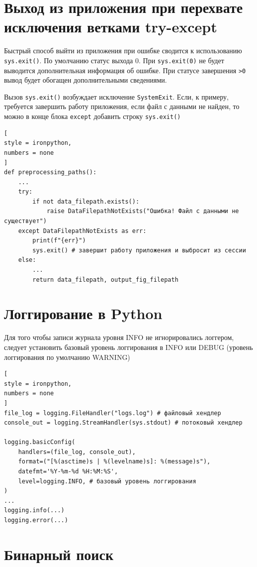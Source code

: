 \documentclass[%
	11pt,
	a4paper,
	utf8,
		]{article}
\begin{document}
\section{Выход из приложения при перехвате исключения ветками try-except}

Быстрый способ выйти из приложения при ошибке сводится к использованию \texttt{sys.exit()}. По умолчанию статус выхода 0. При \texttt{sys.exit(0)} не будет выводится дополнительная информация об ошибке. При статусе завершения \texttt{>0} вывод будет обогащен дополнительными сведениями.

Вызов \texttt{sys.exit()} возбуждает исключение \texttt{SystemExit}. Если, к примеру, требуется завершить работу приложения, если файл с данными не найден, то можно в конце блока \texttt{except} добавить строку \texttt{sys.exit()}
\begin{lstlisting}[
style = ironpython,
numbers = none	
]
def preprocessing_paths():
    ...
    try:
        if not data_filepath.exists():
            raise DataFilepathNotExists("Ошибка! Файл с данными не существует")
    except DataFilepathNotExists as err:
        print(f"{err}")
        sys.exit() # завершит работу приложения и выбросит из сессии
    else:
        ...
        return data_filepath, output_fig_filepath
\end{lstlisting}

\section{Логгирование в Python}

Для того чтобы записи журнала уровня INFO не игнорировались логгером, следует установить базовый уровень логгирования в INFO или DEBUG (уровень логгирования по умолчанию WARNING)
\begin{lstlisting}[
style = ironpython,
numbers = none	
]
file_log = logging.FileHandler("logs.log") # файловый хендлер
console_out = logging.StreamHandler(sys.stdout) # потоковый хендлер

logging.basicConfig(
    handlers=(file_log, console_out),
    format=("[%(asctime)s | %(levelname)s]: %(message)s"),
    datefmt='%Y-%m-%d %H:%M:%S',
    level=logging.INFO, # базовый уровень логгирования
)
...
logging.info(...)
logging.error(...)
\end{lstlisting}

\section{Бинарный поиск}
\end{document}

